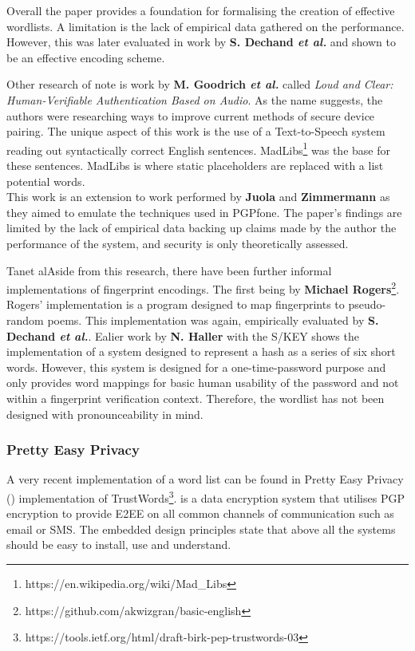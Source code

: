 Overall the paper provides a foundation for formalising the creation of effective wordlists. A limitation is the lack of empirical data gathered on the performance. However, this was later evaluated in work by \textbf{S. Dechand \textit{et al.}}\cite{dechand2016empirical} and shown to be an effective encoding scheme.

Other research of note is work by \textbf{M. Goodrich \textit{et al.}}\cite{goodrich2006loud} called \textit{Loud and Clear: Human-Verifiable Authentication Based on Audio}. As the name suggests, the authors were researching ways to improve current methods of secure device pairing. The unique aspect of this work is the use of a Text-to-Speech system reading out syntactically correct English sentences. MadLibs\footnote{https://en.wikipedia.org/wiki/Mad\_Libs} was the base for these sentences. MadLibs is where static placeholders are replaced with a list potential words.\\
This work is an extension to work performed by \textbf{Juola} and \textbf{Zimmermann}\cite{juola1996whole} as they aimed to emulate the techniques used in PGPfone. The paper's findings are limited by the lack of empirical data backing up claims made by the author the performance of the system, and security is only theoretically assessed.

Tanet alAside from this research, there have been further informal implementations of fingerprint encodings. The first being by \textbf{Michael Rogers}\footnote{https://github.com/akwizgran/basic-english}. Rogers' implementation is a program designed to map fingerprints to pseudo-random poems. This implementation was again, empirically evaluated by \textbf{S. Dechand \textit{et al.}}\cite{dechand2016empirical}. Ealier work by \textbf{N. Haller} with the S/KEY\cite{haller1995s} shows the implementation of a system designed to represent a hash as a series of six short words. However, this system is designed for a one-time-password purpose and only provides word mappings for basic human usability of the password and not within a fingerprint verification context. Therefore, the wordlist has not been designed with pronounceability in mind.

\newpage
\subsubsection*{Pretty Easy Privacy}
\label{sec:pep}
A very recent implementation of a word list can be found in Pretty Easy Privacy (\pep) implementation of TrustWords\footnote{https://tools.ietf.org/html/draft-birk-pep-trustwords-03}. \pep is a data encryption system that utilises PGP encryption to provide E2EE on all common channels of communication such as email or SMS. The embedded design principles state that above all the systems should be easy to install, use and understand.

